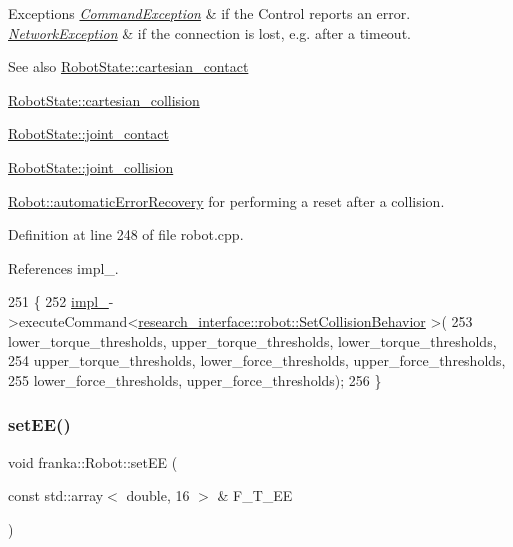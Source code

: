 \begin{DoxyExceptions}{Exceptions}
{\em \hyperlink{structfranka_1_1CommandException}{Command\+Exception}} & if the Control reports an error. \\
\hline
{\em \hyperlink{structfranka_1_1NetworkException}{Network\+Exception}} & if the connection is lost, e.\+g. after a timeout.\\
\hline
\end{DoxyExceptions}
\begin{DoxySeeAlso}{See also}
\hyperlink{structfranka_1_1RobotState_a7fc1f0358d2104d39d301d70544fa6c1}{Robot\+State\+::cartesian\+\_\+contact} 

\hyperlink{structfranka_1_1RobotState_a52c20478f4c1e162df38582ea9bda044}{Robot\+State\+::cartesian\+\_\+collision} 

\hyperlink{structfranka_1_1RobotState_a7243c652a8efe58c343a0d1252302fa4}{Robot\+State\+::joint\+\_\+contact} 

\hyperlink{structfranka_1_1RobotState_a38757bafd4dd8e138410de1dca0c36f8}{Robot\+State\+::joint\+\_\+collision} 

\hyperlink{classfranka_1_1Robot_af682aa673415718715bd859116bc2fed}{Robot\+::automatic\+Error\+Recovery} for performing a reset after a collision. 
\end{DoxySeeAlso}


Definition at line 248 of file robot.\+cpp.



References impl\+\_\+.


\begin{DoxyCode}
251                                                                                     \{
252   \hyperlink{classfranka_1_1Robot_aca155054184e5b6478942fd6a1b82ba4}{impl\_}->executeCommand<\hyperlink{structresearch__interface_1_1robot_1_1SetCollisionBehavior}{research\_interface::robot::SetCollisionBehavior}
      >(
253       lower\_torque\_thresholds, upper\_torque\_thresholds, lower\_torque\_thresholds,
254       upper\_torque\_thresholds, lower\_force\_thresholds, upper\_force\_thresholds,
255       lower\_force\_thresholds, upper\_force\_thresholds);
256 \}
\end{DoxyCode}
\mbox{\label{classfranka_1_1Robot_a5043fca4c35f63b492d9e67c74ddc73b}} 
\subsubsection{\texorpdfstring{set\+E\+E()}{setEE()}}
{\footnotesize\ttfamily void franka\+::\+Robot\+::set\+EE (\begin{DoxyParamCaption}\item[{const std\+::array$<$ double, 16 $>$ \&}]{F\+\_\+\+T\+\_\+\+EE }\end{DoxyParamCaption})}

